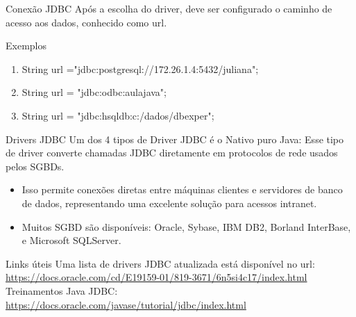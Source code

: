 \documentclass[11pt,aspectratio=43,ignorenonframetext,t]{beamer}
\begin{document}
\begin{frame}{Conexão JDBC}
  Após a escolha do driver, deve ser configurado o caminho de acesso aos dados, conhecido como url.
\begin{block}{Exemplos}
 \begin{enumerate}
  \item String url ="jdbc:postgresql://172.26.1.4:5432/juliana";
  \item String url = "jdbc:odbc:aulajava";
  \item String url = "jdbc:hsqldb:c:/dados/dbexper";
 \end{enumerate}

\end{block}

\end{frame}
\begin{frame}{Drivers JDBC}
  Um dos 4 tipos de Driver JDBC é o Nativo puro Java: Esse tipo de driver converte chamadas JDBC diretamente em protocolos de rede usados pelos SGBDs.
\begin{itemize}
 \item Isso permite conexões diretas entre máquinas clientes e servidores de 
banco de dados, representando uma excelente solução para acessos intranet.
  \item Muitos SGBD são disponíveis: Oracle, Sybase, IBM DB2, Borland InterBase, 
e Microsoft SQLServer.
\end{itemize}

\end{frame}
\begin{frame}{Links úteis}
Uma lista de drivers JDBC atualizada está disponível no url:
\url{https://docs.oracle.com/cd/E19159-01/819-3671/6n5si4c17/index.html}
\vspace{0.5cm}
Treinamentos Java JDBC:\\
\url{https://docs.oracle.com/javase/tutorial/jdbc/index.html}
\end{frame}
\end{document}
